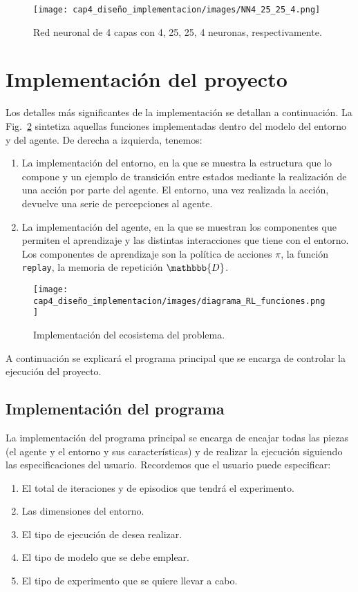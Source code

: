 \begin{figure}
    \centering
    \texttt{[image: cap4\_diseño\_implementacion/images/NN4\_25\_25\_4.png]}
    \caption{Red neuronal de 4 capas con 4, 25, 25, 4 neuronas, respectivamente.}
    \label{fig:NN4_25_25_4}
\end{figure}

\section{Implementación del proyecto}

Los detalles más significantes de la implementación se detallan a continuación. La Fig.~\ref{fig:diagrama_RL_funciones} sintetiza aquellas funciones implementadas dentro del modelo del entorno y del agente. De derecha a izquierda, tenemos:

\begin{enumerate}
    \item La implementación del entorno, en la que se muestra la estructura que lo compone y un ejemplo de transición entre estados mediante la realización de una acción por parte del agente. El entorno, una vez realizada la acción, devuelve una serie de percepciones al agente. 
    \item La implementación del agente, en la que se muestran los componentes que permiten el aprendizaje y las distintas interacciones que tiene con el entorno. Los componentes de aprendizaje son la política de acciones $\pi$, la función \texttt{replay}, la memoria de repetición $\mathbbb{D}$.
\end{enumerate}

\begin{figure}
    \centering
    \texttt{[image: cap4\_diseño\_implementacion/images/diagrama\_RL\_funciones.png]}
    \caption{Implementación del ecosistema del problema.}
    \label{fig:diagrama_RL_funciones}
\end{figure}
A continuación se explicará el programa principal que se encarga de controlar la ejecución del proyecto. 

\subsection{Implementación del programa}

La implementación del programa principal se encarga de encajar todas las piezas (el agente y el entorno y sus características) y de realizar la ejecución siguiendo las especificaciones del usuario. Recordemos que el usuario puede especificar: 
\begin{enumerate}
    \item El total de iteraciones y de episodios que tendrá el experimento. 
    \item Las dimensiones del entorno.
    \item El tipo de ejecución de desea realizar.
    \item El tipo de modelo que se debe emplear. 
    \item El tipo de experimento que se quiere llevar a cabo. 
\end{enumerate}

